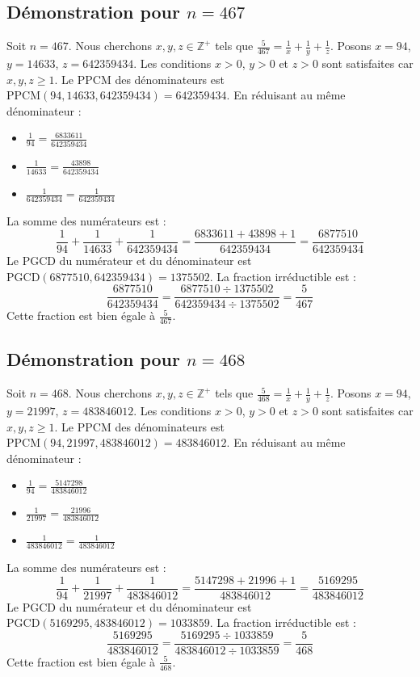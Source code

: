 \documentclass[11pt,a4paper]{article}
\begin{document}
\subsection{Démonstration pour $n = 467$}
Soit $n = 467$. Nous cherchons $x, y, z \in \mathbb{Z}^{+}$ tels que $\frac{5}{467} = \frac{1}{x} + \frac{1}{y} + \frac{1}{z}$.
Posons $x = 94$, $y = 14633$, $z = 642359434$.
Les conditions $x > 0$, $y > 0$ et $z > 0$ sont satisfaites car $x, y, z \geq 1$.
Le PPCM des dénominateurs est $\text{PPCM}(94, 14633, 642359434) = 642359434$.
En réduisant au même dénominateur :
\begin{itemize}
    \item $\frac{1}{94} = \frac{6833611}{642359434}$
    \item $\frac{1}{14633} = \frac{43898}{642359434}$
    \item $\frac{1}{642359434} = \frac{1}{642359434}$
\end{itemize}
La somme des numérateurs est :
$$ \frac{1}{94} + \frac{1}{14633} + \frac{1}{642359434} = \frac{6833611 + 43898 + 1}{642359434} = \frac{6877510}{642359434} $$
Le PGCD du numérateur et du dénominateur est $\text{PGCD}(6877510, 642359434) = 1375502$.
La fraction irréductible est :
$$ \frac{6877510}{642359434} = \frac{6877510 \div 1375502}{642359434 \div 1375502} = \frac{5}{467} $$
Cette fraction est bien égale à $\frac{5}{467}$.

\subsection{Démonstration pour $n = 468$}
Soit $n = 468$. Nous cherchons $x, y, z \in \mathbb{Z}^{+}$ tels que $\frac{5}{468} = \frac{1}{x} + \frac{1}{y} + \frac{1}{z}$.
Posons $x = 94$, $y = 21997$, $z = 483846012$.
Les conditions $x > 0$, $y > 0$ et $z > 0$ sont satisfaites car $x, y, z \geq 1$.
Le PPCM des dénominateurs est $\text{PPCM}(94, 21997, 483846012) = 483846012$.
En réduisant au même dénominateur :
\begin{itemize}
    \item $\frac{1}{94} = \frac{5147298}{483846012}$
    \item $\frac{1}{21997} = \frac{21996}{483846012}$
    \item $\frac{1}{483846012} = \frac{1}{483846012}$
\end{itemize}
La somme des numérateurs est :
$$ \frac{1}{94} + \frac{1}{21997} + \frac{1}{483846012} = \frac{5147298 + 21996 + 1}{483846012} = \frac{5169295}{483846012} $$
Le PGCD du numérateur et du dénominateur est $\text{PGCD}(5169295, 483846012) = 1033859$.
La fraction irréductible est :
$$ \frac{5169295}{483846012} = \frac{5169295 \div 1033859}{483846012 \div 1033859} = \frac{5}{468} $$
Cette fraction est bien égale à $\frac{5}{468}$.
\end{document}
